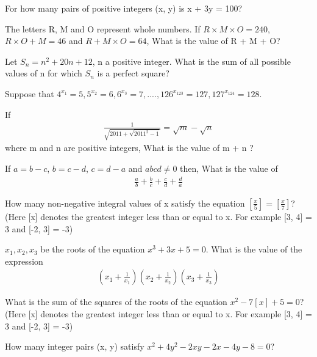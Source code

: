 \item For how many pairs of positive integers (x, y) is x + 3y = 100?

\item The letters R, M and O represent whole numbers. If $R \times M \times O = 240$, $R \times O + M = 46$ and 
$R + M \times O = 64$, What is the value of R + M + O?

\item Let $S_n = n^2 + 20n + 12$, n a positive integer. What is the sum of all possible values of n for which $S_n$ is a perfect square?

\item Suppose that $4^{x_1} = 5, 5^{x_2} = 6, 6^{x_3} = 7,....,126^{x_{123}} = 127, 127^{x_{124}} = 128$.

\item If
\begin{align*}
\frac{1}{\sqrt{2011 + \sqrt{2011^2 - 1}}} = \sqrt{m} - \sqrt{n}
\end{align*}
where m and n are positive integers, What is the value of m + n ?

\item If $a = b - c$, $b = c - d$, $c = d - a$ and $abcd \neq 0$ then, What is the value of 
\begin{align*}
\frac{a}{b} + \frac{b}{c} + \frac{c}{d} + \frac{d}{a}
\end{align*}

\item How many non-negative integral values of x satisfy the equation $[\frac{x}{5}] = [\frac{x}{7}]$?
(Here [x] denotes the greatest integer less than or equal to x. For example [3, 4] = 3 and [-2, 3] = -3)

\item $x_1, x_2, x_3$ be the roots of the equation $x^3 + 3x + 5 = 0$. What is the value of the expression
\begin{align*}
(x_1 + \frac{1}{x_1})(x_2 + \frac{1}{x_2})(x_3 + \frac{1}{x_3})
\end{align*}

\item What is the sum of the squares of the roots of the equation $x^2 - 7[x] + 5 = 0$?
(Here [x] denotes the greatest integer less than or equal to x. For example [3, 4] = 3 and [-2, 3] = -3)

\item How many integer pairs (x, y) satisfy $x^2 + 4y^2 - 2xy - 2x - 4y - 8 = 0$?
